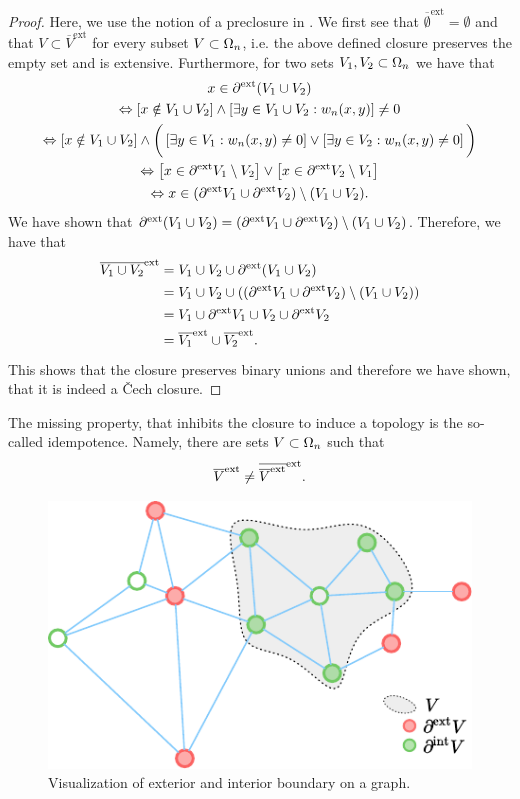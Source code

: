 \begin{proof}
Here, we use the notion of a preclosure in \cite{vcech1966topological}.
We first see that $\overline{\emptyset}^{\text{ext}}=\emptyset$ and that $V\subset \overline{V}^{\text{ext}}$ for every subset $V\subset\Omega_n$, i.e. the above defined closure preserves the empty set and is extensive. Furthermore, for two sets $V_1,V_2\subset \Omega_n$ we have that
%
\begin{gather*} 
x\in \partial^{\text{ext}} (V_1\cup V_2)\\
\Leftrightarrow\left[x\notin V_1\cup V_2\right]\wedge \left[\exists y\in V_1\cup V_2: w_n(x,y) \right]\neq 0\\
\Leftrightarrow 
\left[x\notin V_1\cup V_2\right]\wedge
\bigg(\left[\exists y\in V_1: w_n(x,y) \neq 0 \right]\vee
\left[\exists y\in V_2: w_n(x,y) \neq 0 \right]\bigg)\\
\Leftrightarrow \left[x\in \partial^{\text{ext}} V_1\setminus V_2\right]\vee
\left[x\in  \partial^{\text{ext}} V_2 \setminus V_1 \right]\\
\Leftrightarrow x\in (\partial^{\text{ext}} V_1 \cup \partial^{\text{ext}} V_2)\setminus (V_1\cup V_2).
\end{gather*}
%
We have shown that $\partial^{\text{ext}} (V_1\cup V_2)=(\partial^{\text{ext}} V_1 \cup \partial^{\text{ext}} V_2)\setminus (V_1\cup V_2)$. Therefore, we have that
%
\begin{align*}
\overline{V_1\cup V_2}^{\text{ext}} &= 
V_1\cup V_2 \cup \partial^{\text{ext}} (V_1\cup V_2)\\
&= V_1\cup V_2 \cup ((\partial^{\text{ext}} V_1 \cup \partial^{\text{ext}} V_2)\setminus (V_1\cup V_2))\\
&= V_1\cup \partial^{\text{ext}} V_1 \cup V_2 \cup \partial^{\text{ext}} V_2\\
&= \overline{V_1}^{\text{ext}}\cup\overline{V_2}^{\text{ext}}.
\end{align*}
%
This shows that the closure preserves binary unions and therefore we have shown, that it is indeed a Čech closure.
\end{proof}
%
%
%
The missing property, that inhibits the closure to induce a topology is the so-called idempotence. Namely, there are sets $V\subset \Omega_n$ such that
%
\begin{align*}
\overline{V}^{\text{ext}} \neq \overline{\overline{V}^{\text{ext}}}^{\text{ext}}.
\end{align*}
%
\begin{figure}
\centering
\includegraphics{atelier/SSL/boundary.pdf}
\caption{Visualization of exterior and interior boundary on a graph.}\label{fig:graphb}
\end{figure}
